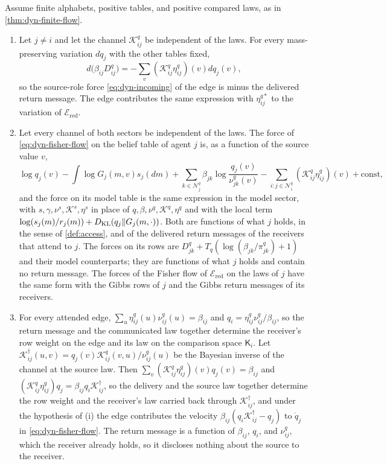 Assume finite alphabets, positive tables, and positive compared laws, as in \cref{thm:dyn-finite-flow}.
\begin{enumerate}
\item[(i)] Let $j\neq i$ and let the channel $\mathcal K^q_{ij}$ be independent of the laws. For every mass-preserving variation $dq_j$ with the other tables fixed,
\begin{equation}
 d\bigl(\beta_{ij}D^q_{ij}\bigr)=-\sum_v(\mathcal K^q_{ij}\eta^q_{ij})(v)dq_j(v),
 \label{eq:dyn-return-force}
\end{equation}
so the source-role force \cref{eq:dyn-incoming} of the edge is minus the delivered return message. The edge contributes the same expression with $\eta^{q*}_{ij}$ to the variation of $\mathcal E_{\mathrm{red}}$.
\item[(ii)] Let every channel of both sectors be independent of the laws. The force of \cref{eq:dyn-fisher-flow} on the belief table of agent $j$ is, as a function of the source value $v$,
\begin{equation}
 \log q_j(v)-\int\log G_j(m,v)s_j(dm)
 +\sum_{k\in\mathcal N^q_j}\beta_{jk}\log\frac{q_j(v)}{\nu^q_{jk}(v)}
 -\sum_{i:j\in\mathcal N^q_i}(\mathcal K^q_{ij}\eta^q_{ij})(v)+\mathrm{const},
 \label{eq:dyn-return-total-force}
\end{equation}
and the force on its model table is the same expression in the model sector, with $s,\gamma,\nu^s,\mathcal K^s,\eta^s$ in place of $q,\beta,\nu^q,\mathcal K^q,\eta^q$ and with the local term $\log(s_j(m)/r_j(m))+D_{\mathrm{KL}}(q_j\Vert G_j(m,\cdot))$. Both are functions of what $j$ holds, in the sense of \cref{def:access}, and of the delivered return messages of the receivers that attend to $j$. The forces on its rows are $D^q_{jk}+T_q(\log(\beta_{jk}/\pi^q_{jk})+1)$ and their model counterparts; they are functions of what $j$ holds and contain no return message. The forces of the Fisher flow of $\mathcal E_{\mathrm{red}}$ on the laws of $j$ have the same form with the Gibbs rows of $j$ and the Gibbs return messages of its receivers.
\item[(iii)] For every attended edge, $\sum_u\eta^q_{ij}(u)\nu^q_{ij}(u)=\beta_{ij}$ and $q_i=\eta^q_{ij}\nu^q_{ij}/\beta_{ij}$, so the return message and the communicated law together determine the receiver's row weight on the edge and its law on the comparison space $\mathsf K_i$. Let $\mathcal K^\dagger_{ij}(u,v)=q_j(v)\mathcal K^q_{ij}(v,u)/\nu^q_{ij}(u)$ be the Bayesian inverse of the channel at the source law. Then $\sum_v(\mathcal K^q_{ij}\eta^q_{ij})(v)q_j(v)=\beta_{ij}$ and $(\mathcal K^q_{ij}\eta^q_{ij})q_j=\beta_{ij}q_i\mathcal K^\dagger_{ij}$, so the delivery and the source law together determine the row weight and the receiver's law carried back through $\mathcal K^\dagger_{ij}$, and under the hypothesis of (i) the edge contributes the velocity $\beta_{ij}(q_i\mathcal K^\dagger_{ij}-q_j)$ to $\dot q_j$ in \cref{eq:dyn-fisher-flow}. The return message is a function of $\beta_{ij}$, $q_i$, and $\nu^q_{ij}$, which the receiver already holds, so it discloses nothing about the source to the receiver.
\end{enumerate}
